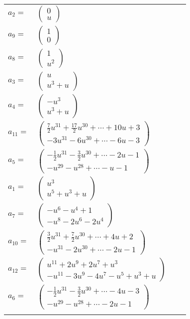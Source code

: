\documentclass[1p]{elsarticle_modified}
\theoremstyle{definition}
\begin{document}
\begin{tabular}{m{7pt} m{180pt} m{7pt} m{180pt} }
\flushright $a_{2}=$&$\begin{pmatrix}0\\u\end{pmatrix}$ \\
\flushright $a_{9}=$&$\begin{pmatrix}1\\0\end{pmatrix}$ \\
\flushright $a_{8}=$&$\begin{pmatrix}1\\u^2\end{pmatrix}$ \\
\flushright $a_{3}=$&$\begin{pmatrix}u\\u^3+u\end{pmatrix}$ \\
\flushright $a_{4}=$&$\begin{pmatrix}- u^3\\u^3+u\end{pmatrix}$ \\
\flushright $a_{11}=$&$\begin{pmatrix}\frac{7}{2} u^{31}+\frac{17}{2} u^{30}+\cdots+10 u+3\\-3 u^{31}-6 u^{30}+\cdots-6 u-3\end{pmatrix}$ \\
\flushright $a_{5}=$&$\begin{pmatrix}-\frac{1}{2} u^{31}-\frac{3}{2} u^{30}+\cdots-2 u-1\\- u^{29}- u^{28}+\cdots- u-1\end{pmatrix}$ \\
\flushright $a_{1}=$&$\begin{pmatrix}u^3\\u^5+u^3+u\end{pmatrix}$ \\
\flushright $a_{7}=$&$\begin{pmatrix}- u^6- u^4+1\\- u^8-2 u^6-2 u^4\end{pmatrix}$ \\
\flushright $a_{10}=$&$\begin{pmatrix}\frac{3}{2} u^{31}+\frac{7}{2} u^{30}+\cdots+4 u+2\\- u^{31}-2 u^{30}+\cdots-2 u-1\end{pmatrix}$ \\
\flushright $a_{12}=$&$\begin{pmatrix}u^{11}+2 u^9+2 u^7+u^3\\- u^{11}-3 u^9-4 u^7- u^5+u^3+u\end{pmatrix}$ \\
\flushright $a_{6}=$&$\begin{pmatrix}-\frac{1}{2} u^{31}-\frac{3}{2} u^{30}+\cdots-4 u-3\\- u^{29}- u^{28}+\cdots-2 u-1\end{pmatrix}$\\&\end{tabular}
\end{document}
